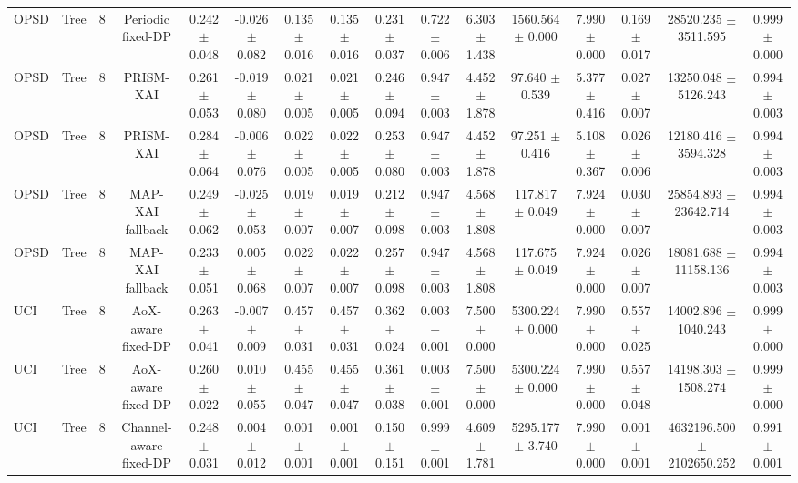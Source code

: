 \begin{tabular}{lccccccccccccccc}
OPSD & Tree & 8 & Periodic fixed-DP & 0.242 $\pm$ 0.048 & -0.026 $\pm$ 0.082 & 0.135 $\pm$ 0.016 & 0.135 $\pm$ 0.016 & 0.231 $\pm$ 0.037 & 0.722 $\pm$ 0.006 & 6.303 $\pm$ 1.438 & 1560.564 $\pm$ 0.000 & 7.990 $\pm$ 0.000 & 0.169 $\pm$ 0.017 & 28520.235 $\pm$ 3511.595 & 0.999 $\pm$ 0.000 \\
OPSD & Tree & 8 & PRISM-XAI & 0.261 $\pm$ 0.053 & -0.019 $\pm$ 0.080 & 0.021 $\pm$ 0.005 & 0.021 $\pm$ 0.005 & 0.246 $\pm$ 0.094 & 0.947 $\pm$ 0.003 & 4.452 $\pm$ 1.878 & 97.640 $\pm$ 0.539 & 5.377 $\pm$ 0.416 & 0.027 $\pm$ 0.007 & 13250.048 $\pm$ 5126.243 & 0.994 $\pm$ 0.003 \\
OPSD & Tree & 8 & PRISM-XAI & 0.284 $\pm$ 0.064 & -0.006 $\pm$ 0.076 & 0.022 $\pm$ 0.005 & 0.022 $\pm$ 0.005 & 0.253 $\pm$ 0.080 & 0.947 $\pm$ 0.003 & 4.452 $\pm$ 1.878 & 97.251 $\pm$ 0.416 & 5.108 $\pm$ 0.367 & 0.026 $\pm$ 0.006 & 12180.416 $\pm$ 3594.328 & 0.994 $\pm$ 0.003 \\
OPSD & Tree & 8 & MAP-XAI fallback & 0.249 $\pm$ 0.062 & -0.025 $\pm$ 0.053 & 0.019 $\pm$ 0.007 & 0.019 $\pm$ 0.007 & 0.212 $\pm$ 0.098 & 0.947 $\pm$ 0.003 & 4.568 $\pm$ 1.808 & 117.817 $\pm$ 0.049 & 7.924 $\pm$ 0.000 & 0.030 $\pm$ 0.007 & 25854.893 $\pm$ 23642.714 & 0.994 $\pm$ 0.003 \\
OPSD & Tree & 8 & MAP-XAI fallback & 0.233 $\pm$ 0.051 & 0.005 $\pm$ 0.068 & 0.022 $\pm$ 0.007 & 0.022 $\pm$ 0.007 & 0.257 $\pm$ 0.098 & 0.947 $\pm$ 0.003 & 4.568 $\pm$ 1.808 & 117.675 $\pm$ 0.049 & 7.924 $\pm$ 0.000 & 0.026 $\pm$ 0.007 & 18081.688 $\pm$ 11158.136 & 0.994 $\pm$ 0.003 \\
UCI & Tree & 8 & AoX-aware fixed-DP & 0.263 $\pm$ 0.041 & -0.007 $\pm$ 0.009 & 0.457 $\pm$ 0.031 & 0.457 $\pm$ 0.031 & 0.362 $\pm$ 0.024 & 0.003 $\pm$ 0.001 & 7.500 $\pm$ 0.000 & 5300.224 $\pm$ 0.000 & 7.990 $\pm$ 0.000 & 0.557 $\pm$ 0.025 & 14002.896 $\pm$ 1040.243 & 0.999 $\pm$ 0.000 \\
UCI & Tree & 8 & AoX-aware fixed-DP & 0.260 $\pm$ 0.022 & 0.010 $\pm$ 0.055 & 0.455 $\pm$ 0.047 & 0.455 $\pm$ 0.047 & 0.361 $\pm$ 0.038 & 0.003 $\pm$ 0.001 & 7.500 $\pm$ 0.000 & 5300.224 $\pm$ 0.000 & 7.990 $\pm$ 0.000 & 0.557 $\pm$ 0.048 & 14198.303 $\pm$ 1508.274 & 0.999 $\pm$ 0.000 \\
UCI & Tree & 8 & Channel-aware fixed-DP & 0.248 $\pm$ 0.031 & 0.004 $\pm$ 0.012 & 0.001 $\pm$ 0.001 & 0.001 $\pm$ 0.001 & 0.150 $\pm$ 0.151 & 0.999 $\pm$ 0.001 & 4.609 $\pm$ 1.781 & 5295.177 $\pm$ 3.740 & 7.990 $\pm$ 0.000 & 0.001 $\pm$ 0.001 & 4632196.500 $\pm$ 2102650.252 & 0.991 $\pm$ 0.001 \\

\end{tabular}
